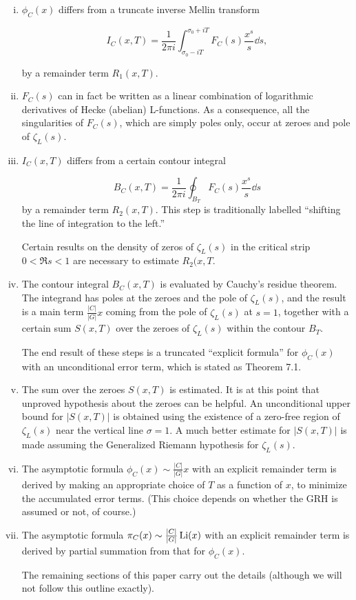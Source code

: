 \documentclass[./main]{subfiles}
\begin{document}
\begin{enumerate}[(i)]
    \item $\phi_C(x)$ differs from a truncate inverse Mellin transform
    
    \[
    I_C(x, T) = \frac{1}{2\pi i} \int_{\sigma_0 - iT}^{\sigma_0 + iT} F_C(s) \frac{x^s}{s} \dd s,
    \]
    
    by a remainder term $R_1(x, T)$.
    
    \item $F_C(s)$ can in fact be written as a linear combination of logarithmic derivatives of Hecke (abelian) L-functions.
    As a consequence, all the singularities of $F_C(s)$, which are simply poles only, occur at zeroes and pole of $\zeta_L(s)$.
    
    \item $I_C(x, T)$ differs from a certain contour integral
    
    \[
    B_C(x, T) = \frac{1}{2\pi i} \oint_{B_T} F_C(s) \frac{x^s}{s} \dd s
    \]
    by a remainder term $R_2(x, T)$.
    This step is traditionally labelled ``shifting the line of integration to the left.''
    
    Certain results on the density of zeros of $\zeta_L(s)$ in the critical strip $0 < \Re s < 1$ are necessary to estimate $R_2(x, T$.
    
    \item The contour integral $B_C(x, T)$ is evaluated by Cauchy's residue theorem.
    The integrand has poles at the zeroes and the pole of $\zeta_L(s)$, and the result is a main term $\frac{|C|}{|G|}x$ coming from the pole of $\zeta_L(s)$ at $s = 1$, together with a certain sum $S(x, T)$ over the zeroes of $\zeta_L(s)$ within the contour $B_T$.
    
    The end result of these steps is a truncated ``explicit formula'' for $\phi_C(x)$ with an unconditional error term, which is stated as Theorem 7.1.
    
    \item The sum over the zeroes $S(x, T)$ is estimated.
    It is at this point that unproved hypothesis about the zeroes can be helpful.
    An unconditional upper bound for $|S(x, T)|$ is obtained using the existence of a zero-free region of $\zeta_L(s)$ near the vertical line $\sigma =1$.
    A much better estimate for $|S(x, T)|$ is made assuming the Generalized Riemann hypothesis for $\zeta_L(s)$.
    
    \item The asymptotic formula $\phi_C(x) \sim \frac{|C|}{|G|}x$ with an explicit remainder term is derived by making an appropriate choice of $T$ as a function of $x$, to minimize the accumulated error terms.
    (This choice depends on whether the GRH is assumed or not, of course.)
    
    \item The asymptotic formula $\pi_C(x) \sim \frac{|C|}{|G|}\operatorname{Li}(x)$ with an explicit remainder term is derived by partial summation from that for $\phi_C(x)$.
    
    The remaining sections of this paper carry out the details (although we will not follow this outline exactly).
\end{enumerate}
\end{document}
